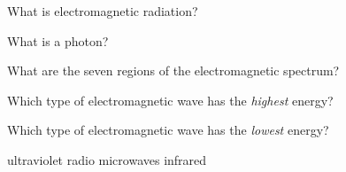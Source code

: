 \documentclass[addpoints]{exam}
\begin{document}
\begin{questions}

\question
What is electromagnetic radiation?


\question
What is a photon?


\question
What are the seven regions of the electromagnetic spectrum?


\question
Which type of electromagnetic wave has the \textit{highest} energy?


\question
Which type of electromagnetic wave has the \textit{lowest} energy?

\begin{choices}
    \choice ultraviolet
    \correctchoice radio
    \choice microwaves
    \choice infrared
\end{choices}



\end{questions}
\end{document}
